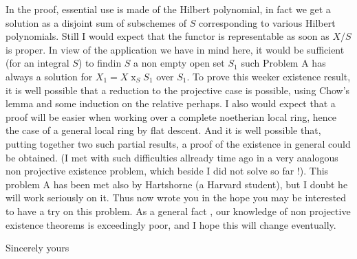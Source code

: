 In the proof, essential use is made of the Hilbert polynomial, in fact we get a solution as a disjoint sum of subschemes of $S$ corresponding to various Hilbert polynomials. Still I would expect that the  functor is representable as soon as $X/S$ is proper. In view of the application we have in mind here, it would be sufficient (for an integral $S$) to findin $S$ a non empty  open set $S_1$ such Problem A has always a solution for $X_1=X\mathbin{x}_S S_1$ over $S_1$. To prove this weeker existence result, it is well possible that a reduction to the projective case is possible, using Chow's lemma and some induction on the relative  perhaps. I also would expect that a proof will be easier when working over a complete noetherian local ring, hence the case of a general  local ring by flat descent. And it is well possible that, putting together two such partial results, a proof of the existence in general could be obtained. (I met with such difficulties allready time ago in a very analogous non projective existence problem, which beside I did not solve so far !). This problem A has been met also by Hartshorne (a Harvard student), but I doubt he will work seriously on it. Thus  now wrote you in the hope you may be interested to have a try on this problem. As a general fact , our knowledge of non projective existence theorems is exceedingly poor, and I hope this will change eventually.

Sincerely yours\\
\\
